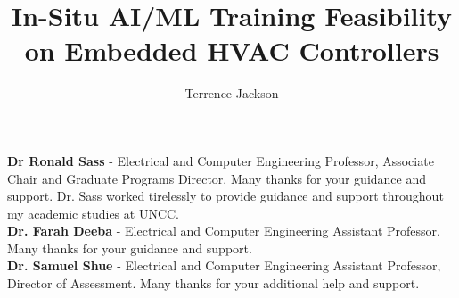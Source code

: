 \documentclass{UNCC-thesis}
\begin{document}
\fbmatterchapterformat
%
%

\title{In-Situ AI/ML Training Feasibility on Embedded HVAC Controllers}
\author{Terrence Jackson}





\maketitlepage

\begin{abstract}

\end{abstract}




\begin{acknowledgements}
\textbf{Dr Ronald Sass} - Electrical and Computer Engineering Professor, Associate
Chair and Graduate Programs Director.  Many thanks for your guidance and support. 
Dr. Sass worked tirelessly to provide guidance and support throughout my academic
studies at UNCC. \\

\textbf{Dr. Farah Deeba} - Electrical and Computer Engineering Assistant Professor. 
Many thanks for your guidance and support. \\

\textbf{Dr. Samuel Shue} - Electrical and Computer Engineering Assistant Professor, 
Director of Assessment.  Many thanks for your additional help and support. \\

\par
\end{acknowledgements}
\end{document}
